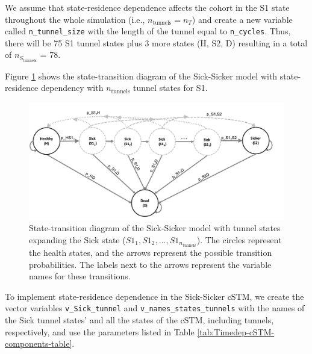 \documentclass[
]{article}
\begin{document}
We assume that state-residence dependence affects the cohort in the S1 state throughout the whole simulation (i.e., \(n_{\text{tunnels}}=n_T\)) and create a new variable called \texttt{n\_tunnel\_size} with the length of the tunnel equal to \texttt{n\_cycles}. Thus, there will be 75 S1 tunnel states plus 3 more states (H, S2, D) resulting in a total of \(n_{S_{\text{tunnels}}}\) = 78.

Figure \ref{fig:STD-Sick-Sicker-tunnels} shows the state-transition diagram of the Sick-Sicker model with state-residence dependency with \(n_{\text{tunnels}}\) tunnel states for S1.

\begin{figure}[H]

{\centering \includegraphics[width=1\linewidth]{figs/Figure 3 - Sick-Sicker-with-tunnels} 

}

\caption{State-transition diagram of the Sick-Sicker model with tunnel states expanding the Sick state ($S1_1, S1_2,...,S1_{n_{\text{tunnels}}}$). The circles represent the health states, and the arrows represent the possible transition probabilities. The labels next to the arrows represent the variable names for these transitions.}\label{fig:STD-Sick-Sicker-tunnels}
\end{figure}

To implement state-residence dependence in the Sick-Sicker cSTM, we create the vector variables \texttt{v\_Sick\_tunnel} and \texttt{v\_names\_states\_tunnels} with the names of the Sick tunnel states' and all the states of the cSTM, including tunnels, respectively, and use the parameters listed in Table \ref{tab:Timedep-cSTM-components-table}.
\end{document}
